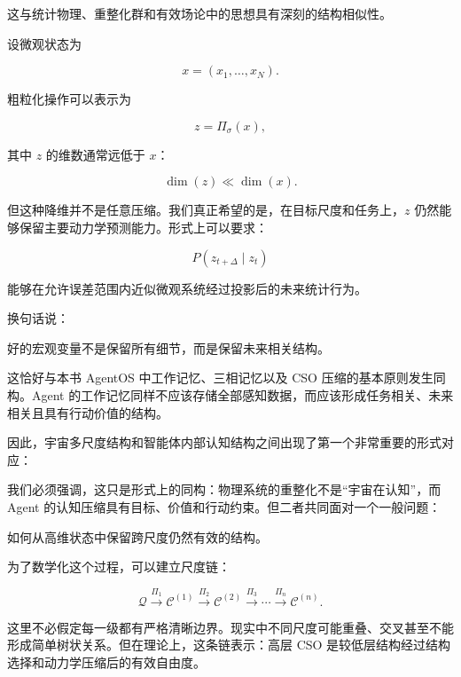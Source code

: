这与统计物理、重整化群和有效场论中的思想具有深刻的结构相似性。

设微观状态为

\[
x
=
(x_1,\ldots,x_N).
\]

粗粒化操作可以表示为

\[
z
=
\Pi_{\sigma}(x),
\]

其中 $z$ 的维数通常远低于 $x$：

\[
\dim(z)\ll\dim(x).
\]

但这种降维并不是任意压缩。我们真正希望的是，在目标尺度和任务上，$z$ 仍然能够保留主要动力学预测能力。形式上可以要求：

\[
P
\left(
z_{t+\Delta}
\mid
z_t
\right)
\]

能够在允许误差范围内近似微观系统经过投影后的未来统计行为。

换句话说：

\begin{statementbox}
好的宏观变量不是保留所有细节，而是保留未来相关结构。
\end{statementbox}

这恰好与本书 AgentOS 中工作记忆、三相记忆以及 CSO 压缩的基本原则发生同构。Agent 的工作记忆同样不应该存储全部感知数据，而应该形成任务相关、未来相关且具有行动价值的结构。

因此，宇宙多尺度结构和智能体内部认知结构之间出现了第一个非常重要的形式对应：

\begin{statementbox}
\centering
{}
\end{statementbox}

我们必须强调，这只是形式上的同构：物理系统的重整化不是“宇宙在认知”，而 Agent 的认知压缩具有目标、价值和行动约束。但二者共同面对一个一般问题：

\begin{statementbox}
如何从高维状态中保留跨尺度仍然有效的结构。
\end{statementbox}

为了数学化这个过程，可以建立尺度链：

\[
\mathcal{Q}
\xrightarrow{\Pi_1}
\mathcal{C}^{(1)}
\xrightarrow{\Pi_2}
\mathcal{C}^{(2)}
\xrightarrow{\Pi_3}
\cdots
\xrightarrow{\Pi_n}
\mathcal{C}^{(n)}.
\]

这里不必假定每一级都有严格清晰边界。现实中不同尺度可能重叠、交叉甚至不能形成简单树状关系。但在理论上，这条链表示：高层 CSO 是较低层结构经过结构选择和动力学压缩后的有效自由度。

